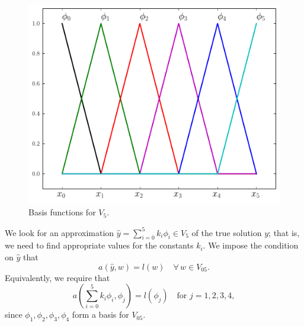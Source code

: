 \begin{figure}[ht]
\centering
\includegraphics[width=\textwidth]{basis_functions.pdf}
\caption{Basis functions for $V_5$.}
\label{FEM:basis_functions}
\end{figure}

We look for an approximation $\hat{y} = \sum_{i=0}^5 k_i \phi_i \in V_5$ of the true solution $y$; that is, we need to find appropriate values for the constants $k_i$. We impose the condition on $\hat{y}$ that 
\[a(\hat{y},w) = l(w) \quad \forall \, w \in V_{05}.\]
Equivalently, we require that 
\[a \left( \sum_{i=0}^5 k_i \phi_i,\phi_j \right) = l(\phi_j) \quad \text{for } j = 1,2,3,4,\]
since $\phi_1, \phi_2, \phi_3, \phi_4$ form a basis for $V_{05}$.


